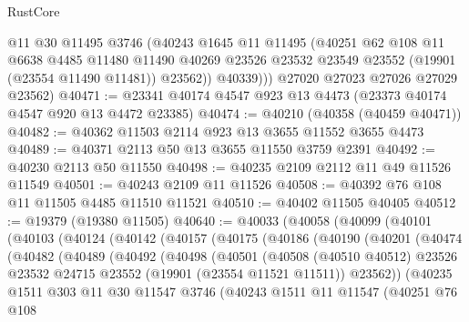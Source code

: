 \begin{lexlean}{RustCore}
\begin{coremodule}
            @11
            @30
            @11495
            @3746
            (@40243
              @1645
              @11
              @11495
              (@40251
                @62
                @108
                @11
                @6638
                @4485
                @11480
                @11490
                @40269
                @23526
                @23532
                @23549
                @23552
                (@19901 (@23554 @11490 @11481))
                @23562))
            @40339)))
      @27020
      @27023
      @27026
      @27029
      @23562)
@40471 := @23341 @40174 @4547 @923 @13 @4473 (@23373 @40174 @4547 @920 @13 @4472 @23385)
@40474 := @40210 (@40358 (@40459 @40471))
@40482 := @40362 @11503 @2114 @923 @13 @3655 @11552 @3655 @4473
@40489 := @40371 @2113 @50 @13 @3655 @11550 @3759 @2391
@40492 := @40230 @2113 @50 @11550
@40498 := @40235 @2109 @2112 @11 @49 @11526 @11549
@40501 := @40243 @2109 @11 @11526
@40508 := @40392 @76 @108 @11 @11505 @4485 @11510 @11521
@40510 := @40402 @11505 @40405
@40512 := @19379 (@19380 @11505)
@40640 := @40033
    (@40058
      (@40099
        (@40101
          (@40103
            (@40124
              (@40142
                (@40157
                  (@40175
                    (@40186
                      (@40190
                        (@40201
                          (@40474
                            (@40482
                              (@40489
                                (@40492
                                  (@40498
                                    (@40501
                                      (@40508
                                        (@40510 @40512)
                                        @23526
                                        @23532
                                        @24715
                                        @23552
                                        (@19901 (@23554 @11521 @11511))
                                        @23562))
                                    (@40235
                                      @1511
                                      @303
                                      @11
                                      @30
                                      @11547
                                      @3746
                                      (@40243
                                        @1511
                                        @11
                                        @11547
                                        (@40251
                                          @76
                                          @108

\end{coremodule}
\end{lexlean}
